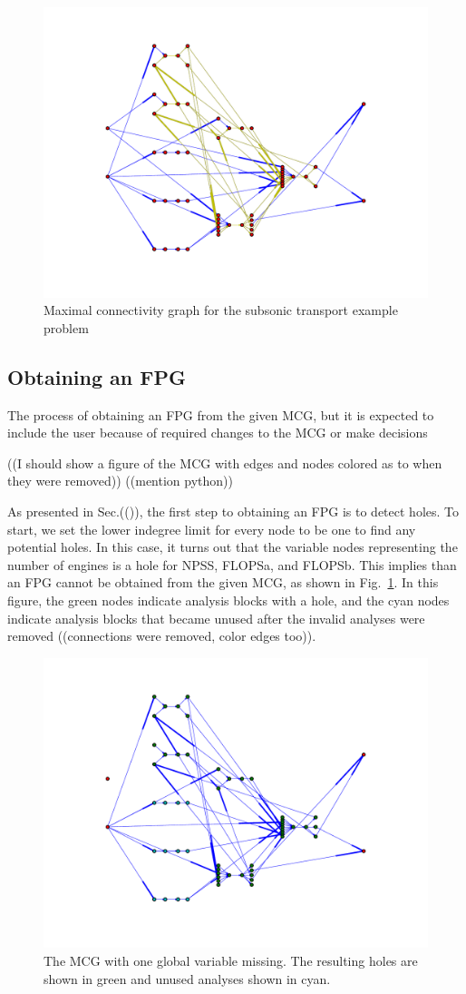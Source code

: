 \begin{figure}[htb!]
  \begin{center}
    \includegraphics[width=.6\textwidth]{images/MCG}
  \end{center}
  \caption{Maximal connectivity graph for the subsonic transport example problem}
\end{figure}

\subsection{Obtaining an FPG}
The process of obtaining an FPG from the given MCG, but it is expected to include the user because of required changes to the MCG or make decisions

((I should show a figure of the MCG with edges and nodes colored as to when they were removed))
((mention python))

As presented in Sec.(()), the first step to obtaining an FPG is to detect holes. To start, we set the lower indegree limit for every node to be one to find any potential holes. In this case, it turns out that the variable nodes representing the number of engines is a hole for NPSS, FLOPSa, and FLOPSb. This implies than an FPG cannot be obtained from the given MCG, as shown in Fig.~\ref{f:MCG nengines}. In this figure, the green nodes indicate analysis blocks with a hole, and the cyan nodes indicate analysis blocks that became unused after the invalid analyses were removed ((connections were removed, color edges too)).
\begin{figure}[htb!]
  \begin{center}
    \includegraphics[width=.6\textwidth]{images/MCG_nengines}
  \end{center}
  \caption{The MCG with one global variable missing. The resulting holes are shown in green and unused analyses shown in cyan.}
\label{f:MCG nengines}
\end{figure}

